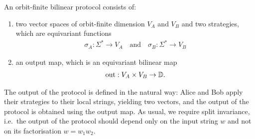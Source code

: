 
\begin{definition}
    \label{def:orbit-finite-scalar-product-protocol}
    An orbit-finite bilinear protocol consists of:
    \begin{enumerate}
        \item two vector spaces of orbit-finite dimension $V_A$ and $V_B$ and two strategies, which are equivariant functions
        \begin{align*}
        \sigma_A : \Sigma^* \to V_A 
        \quad \text{and} \quad
        \sigma_B : \Sigma^* \to V_B
        \end{align*}
        \item an output map, which is an equivariant bilinear map 
        \begin{align*}
        \text{out} : V_A \times V_B \to \mathbb D.
        \end{align*}
    \end{enumerate}
\end{definition}
The output of the protocol is defined in the natural way: Alice and Bob apply their strategies to their local strings, yielding two vectors, and the output of the protocol is obtained using the output map. As usual, we require split invariance, i.e.~the output of the protocol should depend only on the input string $w$ and not on its factorisation $w = w_1 w_2$.


